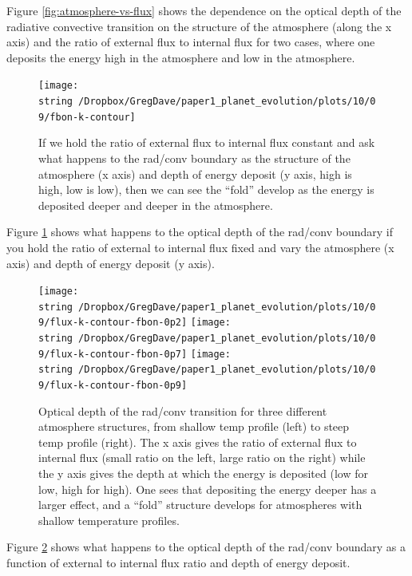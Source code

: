 \documentclass{emulateapj}
\begin{document}
Figure \ref{fig:atmosphere-vs-flux} shows the dependence on the
optical depth of the radiative convective transition on the structure
of the atmosphere (along the x axis) and the ratio of external flux to
internal flux for two cases, where one deposits the energy high in the
atmosphere and low in the atmosphere.  

\begin{figure}
  \centering
  \texttt{[image: \\string~/Dropbox/GregDave/paper1\_planet\_evolution/plots/10/09/fbon-k-contour]}
  \caption{If we hold the ratio of external flux to internal flux
    constant and ask what happens to the rad/conv boundary as the
    structure of the atmosphere (x axis) and depth of energy deposit
    (y axis, high is high, low is low), then we can see the ``fold''
    develop as the energy is deposited deeper and deeper in the
    atmosphere.}
  \label{fig:atmosphere-vs-depth}
\end{figure}

Figure \ref{fig:atmosphere-vs-depth} shows what happens to the optical
depth of the rad/conv boundary if you hold the ratio of external to
internal flux fixed and vary the atmosphere (x axis) and depth of
energy deposit (y axis).  

\begin{figure}
  \centering
\texttt{[image: \\string~/Dropbox/GregDave/paper1\_planet\_evolution/plots/10/09/flux-k-contour-fbon-0p2]}
\hfill
\texttt{[image: \\string~/Dropbox/GregDave/paper1\_planet\_evolution/plots/10/09/flux-k-contour-fbon-0p7]}
\hfill
\texttt{[image: \\string~/Dropbox/GregDave/paper1\_planet\_evolution/plots/10/09/flux-k-contour-fbon-0p9]}
\caption{Optical depth of the rad/conv transition for three different
  atmosphere structures, from shallow temp profile (left) to steep
  temp profile (right).  The x axis gives the ratio of external flux
  to internal flux (small ratio on the left, large ratio on the right)
  while the y axis gives the depth at which the energy is deposited
  (low for low, high for high).  One sees that depositing the energy
  deeper has a larger effect, and a ``fold'' structure develops for
  atmospheres with shallow temperature profiles.}
\label{fig:flux-vs-depth}
\end{figure}

Figure \ref{fig:flux-vs-depth} shows what happens to the optical depth
of the rad/conv boundary as a function of external to internal flux
ratio and depth of energy deposit.  
\end{document}
